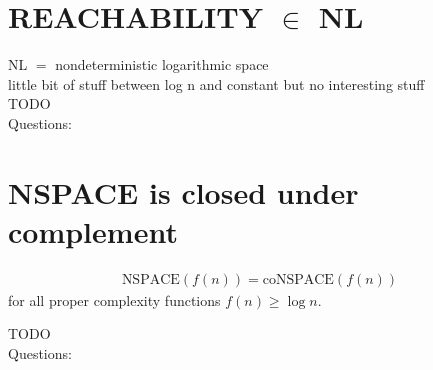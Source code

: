 \documentclass[a4]{scrartcl}
\begin{document}
\section*{REACHABILITY $\in$ NL}
NL $=$ nondeterministic logarithmic space \\
little bit of stuff between log n and constant but no interesting stuff \\

\color{red} TODO \\
\color{black}
\color{violet} Questions:
\color{black}



\section*{NSPACE is closed under complement}

\begin{align*}
\text{NSPACE}(f(n)) = \text{coNSPACE}(f(n))
\end{align*}
for all proper complexity functions $f(n) \geq \log n$.


\color{red} TODO \\
\color{black}
\color{violet} Questions:
\color{black}




\newpage

\printbibliography
\end{document}
